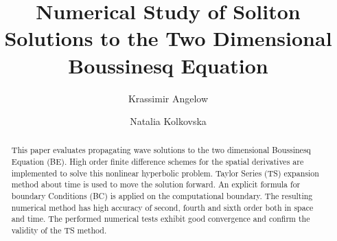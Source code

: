 \documentclass[11pt,a4paper,twoside]{article}
\begin{document}

\title{Numerical Study of Soliton Solutions to the Two Dimensional Boussinesq  Equation}




\author{Krassimir Angelow}
\address{Bulgarian Academy of Sciences, Institute of Mathematics and Informatics, ul. Acad. G. Bonchev, block 8, 1113 Sofia, Bulgaria}

\author{Natalia Kolkovska}
\address{Bulgarian Academy of Sciences, Institute of Mathematics and Informatics, ul. Acad. G. Bonchev, block 8, 1113 Sofia, Bulgaria}



\BeginPaper %


\newcommand{\ep}{\varepsilon}
\newcommand{\eps}[1]{{#1}_{\varepsilon}}
\newcommand{\rf}[1]{(\ref{#1})}
\newcommand{\RR}{\mathbb{R}}



\begin{abstract}
This paper evaluates propagating wave solutions to the two dimensional Boussinesq Equation (BE). High order finite difference schemes for the spatial derivatives are implemented to solve this nonlinear hyperbolic problem. Taylor Series (TS) expansion method about time is used to move the solution forward. An explicit formula for boundary Conditions (BC) is applied on the computational boundary. The resulting numerical method has high accuracy of second, fourth and sixth order both in space and time. The performed numerical tests exhibit good convergence and confirm the validity of the TS method.


\end{abstract}
\end{document}
